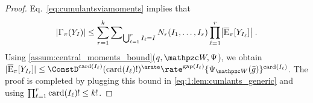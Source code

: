 \begin{proof}
Eq.~\eqref{eq:cumulantsviamoments}
implies that
\begin{equation}
  \label{eq:1:lem:cumlants_generic}
|\Gamma_{\pi}(Y_I)| \leq \sum_{r=1}^k \sum\nolimits_{\bigcup_{\ell=1}^r I_{\ell} = I} N_r(I_1, \ldots, I_r) \prod_{\ell=1}^r \bigl|\overline{\mathrm{E}}_{\pi}[Y_{I_{\ell}} ]\bigr|\;.
\end{equation}
Using \cref{assum:central_moments_bound}($q,\lyapW,\normlike$), we obtain
$|\PEC_\pi[Y_{I_{\ell}}] | \leq  \ConstD^{\card{I_{\ell}}} (\card{I_{\ell}}!)^{\arate} \rate^{\maxgap(I_{\ell})}\{\normlike_{\lyapW}(\bar{g})\}^{\card{I_\ell}}$.
The proof is completed by plugging this bound in \eqref{eq:1:lem:cumlants_generic} and using $\prod_{\ell=1}^r \operatorname{card}(I_\ell)! \leq k!$.
\end{proof}

